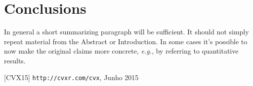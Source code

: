 \documentclass[a4paper]{IEEEtran}
\begin{document}
\section{Conclusions}
\label{sec:conclusion}

In general a short summarizing paragraph will be sufficient. It should
not simply repeat material from the Abstract or Introduction. In some
cases it's possible to now make the original claims more concrete,
\textit{e.g.}, by referring to quantitative results.


\begin{thebibliography}{9}

  [CVX15] \texttt{http://cvxr.com/cvx}, Junho 2015

\end{thebibliography}
\end{document}
